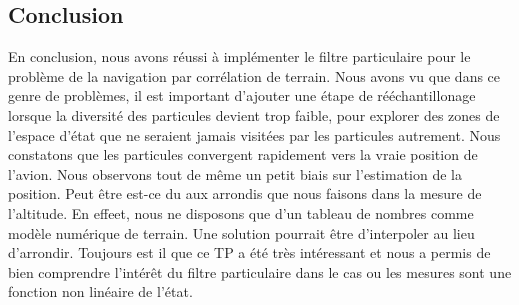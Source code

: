 \documentclass{article}
\begin{document}
\subsection{Conclusion}
En conclusion, nous avons réussi à implémenter le 
filtre particulaire pour le problème de la navigation par corrélation de terrain.
Nous avons vu que dans ce genre de problèmes, il est important d'ajouter
une étape de rééchantillonage lorsque la diversité des particules devient trop faible, pour explorer
des zones de l'espace d'état que ne seraient jamais visitées par les particules autrement. Nous constatons que 
les particules convergent rapidement vers la vraie position de l'avion. Nous observons tout de même un petit biais 
sur l'estimation de la position. Peut être est-ce du aux arrondis que nous faisons dans la mesure de l'altitude. En effeet, nous ne disposons
que d'un tableau de nombres comme modèle numérique de terrain. Une solution pourrait être d'interpoler au lieu d'arrondir. Toujours est il 
que ce TP a été très intéressant et nous a permis de bien comprendre l'intérêt du filtre particulaire 
dans le cas ou les mesures sont une fonction non linéaire de l'état.
\clearpage


\clearpage
\end{document}
